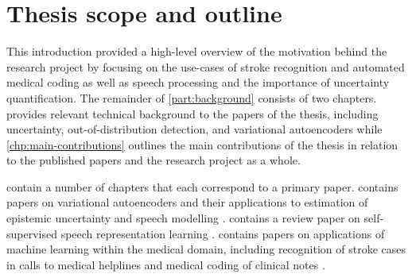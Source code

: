 \section{Thesis scope and outline}
%
%
%
This introduction provided a high-level overview of the motivation behind the research project by focusing on the use-cases of stroke recognition and automated medical coding as well as speech processing and the importance of uncertainty quantification. 
The remainder of \cref{part:background} consists of two chapters.  provides relevant technical background to the papers of the thesis, including uncertainty, out-of-distribution detection, and variational autoencoders while \cref{chp:main-contributions} outlines the main contributions of the thesis in relation to the published papers and the research project as a whole.

 contain a number of chapters that each correspond to a primary paper.  contains papers on variational autoencoders and their applications to estimation of epistemic uncertainty and speech modelling \cite{havtorn_hierarchical_2021,havtorn_benchmarking_2022,bergamin_modelagnostic_2022}.  contains a review paper on self-supervised speech representation learning \cite{mohamed_selfsupervised_2022}.  contains papers on applications of machine learning within the medical domain, including recognition of stroke cases in calls to medical helplines \cite{wenstrup_retrospective_2023} and medical coding of clinical notes \cite{edin_automated_2023}. 

